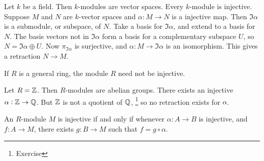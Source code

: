 \begin{example*}
Let $ k $ be a field. Then $ k $-modules are vector spaces. Every $ k $-module is injective. Suppose $ M $ and $ N $ are $ k $-vector spaces and $ \alpha : M \to N $ is a injective map. Then $ \Im \alpha $ is a submodule, or subspace, of $ N $. Take a basis for $ \Im \alpha $, and extend to a basis for $ N $. The basis vectors not in $ \Im \alpha $ form a basis for a complementary subspace $ U $, so $ N = \Im \alpha \oplus U $. Now $ \pi_{\Im \alpha} $ is surjective, and $ \alpha : M \to \Im \alpha $ is an isomorphism. This gives a retraction $ N \to M $.
\end{example*}

If $ R $ is a general ring, the module $ R $ need not be injective.

\begin{example*}
Let $ R = \mathbb{Z} $. Then $ R $-modules are abelian groups. There exists an injective $ \alpha : \mathbb{Z} \to \mathbb{Q} $. But $ \mathbb{Z} $ is not a quotient of $ \mathbb{Q} $, \footnote{Exercise} so no retraction exists for $ \alpha $.
\end{example*}

\begin{proposition}
An $ R $-module $ M $ is injective if and only if whenever $ \alpha : A \to B $ is injective, and $ f : A \to M $, there exists $ g : B \to M $ such that $ f = g \circ \alpha $.
\end{proposition}


